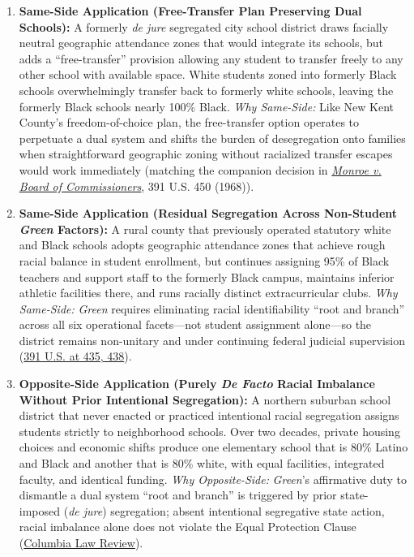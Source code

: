 \documentclass[12pt]{article}
\begin{document}
\begin{enumerate}
\item \textbf{Same-Side Application (Free-Transfer Plan Preserving Dual Schools):} A formerly \textit{de jure} segregated city school district draws facially neutral geographic attendance zones that would integrate its schools, but adds a ``free-transfer'' provision allowing any student to transfer freely to any other school with available space. White students zoned into formerly Black schools overwhelmingly transfer back to formerly white schools, leaving the formerly Black schools nearly 100\% Black. \textit{Why Same-Side:} Like New Kent County's freedom-of-choice plan, the free-transfer option operates to perpetuate a dual system and shifts the burden of desegregation onto families when straightforward geographic zoning without racialized transfer escapes would work immediately (matching the companion decision in \href{https://caselaw.findlaw.com/court/us-supreme-court/391/450.html}{\textit{Monroe v. Board of Commissioners}}, 391 U.S. 450 (1968)).

\item \textbf{Same-Side Application (Residual Segregation Across Non-Student \textit{Green} Factors):} A rural county that previously operated statutory white and Black schools adopts geographic attendance zones that achieve rough racial balance in student enrollment, but continues assigning 95\% of Black teachers and support staff to the formerly Black campus, maintains inferior athletic facilities there, and runs racially distinct extracurricular clubs. \textit{Why Same-Side:} \textit{Green} requires eliminating racial identifiability ``root and branch'' across all six operational facets---not student assignment alone---so the district remains non-unitary and under continuing federal judicial supervision (\href{https://supreme.justia.com/cases/federal/us/391/430/}{391 U.S. at 435, 438}).

\item \textbf{Opposite-Side Application (Purely \textit{De Facto} Racial Imbalance Without Prior Intentional Segregation):} A northern suburban school district that never enacted or practiced intentional racial segregation assigns students strictly to neighborhood schools. Over two decades, private housing choices and economic shifts produce one elementary school that is 80\% Latino and Black and another that is 80\% white, with equal facilities, integrated faculty, and identical funding. \textit{Why Opposite-Side:} \textit{Green}'s affirmative duty to dismantle a dual system ``root and branch'' is triggered by prior state-imposed (\textit{de jure}) segregation; absent intentional segregative state action, racial imbalance alone does not violate the Equal Protection Clause (\href{https://columbialawreview.org/content/the-contested-role-of-time-in-equal-protection/}{Columbia Law Review}).


\end{enumerate}
\end{document}
